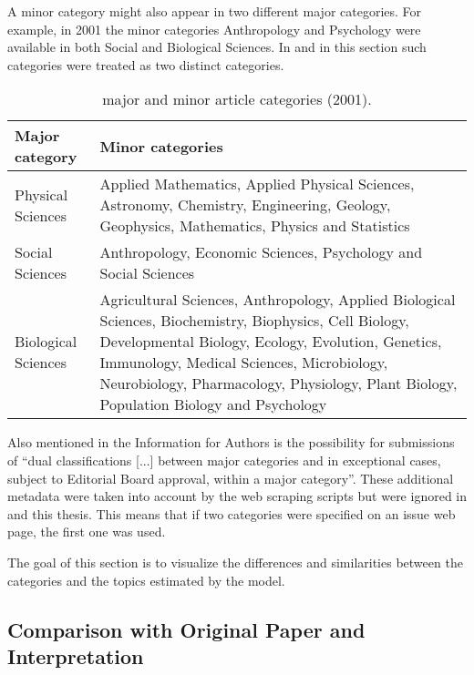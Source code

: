 A minor category might also appear in two different major categories. For example, in 2001 the minor categories Anthropology and Psychology were available in both Social and Biological Sciences. In  and in this section such categories were treated as two distinct categories.

\begin{table}[htbp] \footnotesize %
\begin{center}
\begin{tabular}{l p{12cm}}
  \toprule
   \textbf{Major category} & \textbf{Minor categories} \\
  \midrule
  Physical Sciences & Applied Mathematics, Applied Physical Sciences, Astronomy, Chemistry, Engineering, Geology, Geophysics, Mathematics, Physics and Statistics\\

  Social Sciences & Anthropology, Economic Sciences, Psychology and Social Sciences\\

  Biological Sciences & Agricultural Sciences, Anthropology, Applied Biological Sciences, Biochemistry, Biophysics, Cell Biology, Developmental Biology, Ecology, Evolution, Genetics, Immunology, Medical Sciences, Microbiology, Neurobiology, Pharmacology, Physiology, Plant Biology, Population Biology and Psychology\\

    \bottomrule
\end{tabular}
\caption{ major and minor article categories (2001).}
\label{tbl:pnas-classification}
\end{center}
\end{table}

Also mentioned in the Information for Authors is the possibility for submissions of ``dual classifications [...] between major categories and in exceptional cases, subject to Editorial Board approval, within a major category''. These additional metadata were taken into account by the web scraping scripts but were ignored in \citet{Griffiths2004} and this thesis. This means that if two categories were specified on an issue web page, the first one was used.

The goal of this section is to visualize the differences and similarities between the categories and the topics estimated by the model. %



\subsection{Comparison with Original Paper and Interpretation}

